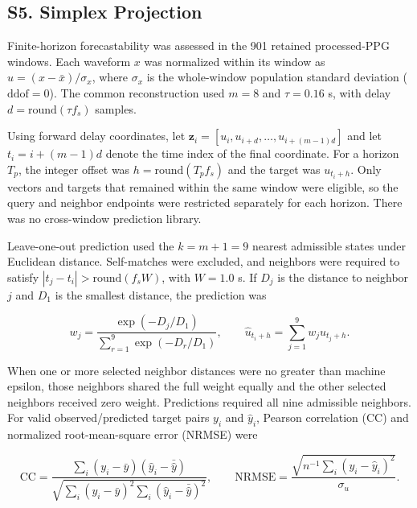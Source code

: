 \begingroup
\renewcommand{\thetable}{S\arabic{table}}
\renewcommand{\thefigure}{S\arabic{figure}}
\setcounter{table}{4}
\setcounter{figure}{2}

\subsection*{S5. Simplex Projection}

Finite-horizon forecastability was assessed in the 901 retained processed-PPG windows. Each waveform $x$ was normalized within its window as $u=(x-\bar{x})/\sigma_x$, where $\sigma_x$ is the whole-window population standard deviation ($\mathrm{ddof}=0$). The common reconstruction used $m=8$ and $\tau=0.16$ s, with delay $d=\mathrm{round}(\tau f_s)$ samples.

Using forward delay coordinates, let $\mathbf{z}_i=[u_i,u_{i+d},\ldots,u_{i+(m-1)d}]$ and let $t_i=i+(m-1)d$ denote the time index of the final coordinate. For a horizon $T_p$, the integer offset was $h=\mathrm{round}(T_p f_s)$ and the target was $u_{t_i+h}$. Only vectors and targets that remained within the same window were eligible, so the query and neighbor endpoints were restricted separately for each horizon. There was no cross-window prediction library.

Leave-one-out prediction used the $k=m+1=9$ nearest admissible states under Euclidean distance. Self-matches were excluded, and neighbors were required to satisfy $|t_j-t_i|>\mathrm{round}(f_s W)$, with $W=1.0$ s. If $D_j$ is the distance to neighbor $j$ and $D_1$ is the smallest distance, the prediction was

\[
w_j=\frac{\exp(-D_j/D_1)}{\sum_{r=1}^{9}\exp(-D_r/D_1)},\qquad \widehat{u}_{t_i+h}=\sum_{j=1}^{9}w_j u_{t_j+h}.
\]

When one or more selected neighbor distances were no greater than machine epsilon, those neighbors shared the full weight equally and the other selected neighbors received zero weight. Predictions required all nine admissible neighbors. For valid observed/predicted target pairs $y_i$ and $\widehat{y}_i$, Pearson correlation (CC) and normalized root-mean-square error (NRMSE) were

\[
\mathrm{CC}=\frac{\sum_i(y_i-\bar{y})(\widehat{y}_i-\bar{\widehat{y}})}{\sqrt{\sum_i(y_i-\bar{y})^2\sum_i(\widehat{y}_i-\bar{\widehat{y}})^2}},\qquad \mathrm{NRMSE}=\frac{\sqrt{n^{-1}\sum_i(y_i-\widehat{y}_i)^2}}{\sigma_u}.
\]

